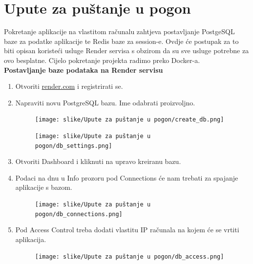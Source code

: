 			\eject 
		
		\section{Upute za puštanje u pogon}
		    Pokretanje aplikacije na vlastitom računalu zahtjeva postavljanje PostgeSQL baze za podatke aplikacije te Redis baze za session-e. Ovdje će postupak za to biti opisan koristeći usluge Render servisa s obzirom da su sve usluge potrebne za ovo besplatne. Cijelo pokretanje projekta radimo preko Docker-a.
		    \\
		
			\textbf{Postavljanje baze podataka na Render servisu}
			
			\begin{enumerate}
			    \item Otvoriti \href{https://render.com/}{render.com} i registrirati se.
			    \item Napraviti novu PostgreSQL bazu. Ime odabrati proizvoljno.
			    
			    \begin{figure}[H]
        			\texttt{[image: slike/Upute za puštanje u pogon/create\_db.png]}
        			\centering
        		\end{figure}
        		
        		\begin{figure}[H]
        			\texttt{[image: slike/Upute za puštanje u pogon/db\_settings.png]}
        			\centering
        		\end{figure}
        		
        		\item Otvoriti Dashboard i kliknuti na upravo kreiranu bazu.
        		\item Podaci na dnu u Info prozoru pod Connections će nam trebati za spajanje aplikacije s bazom.
        		
        		\begin{figure}[H]
        			\texttt{[image: slike/Upute za puštanje u pogon/db\_connections.png]}
        			\centering
        		\end{figure}
        		
        		\item Pod Access Control treba dodati vlastitu IP računala na kojem će se vrtiti aplikacija.
        		
        		\begin{figure}[H]
        			\texttt{[image: slike/Upute za puštanje u pogon/db\_access.png]}
        			\centering
        		\end{figure}
			
			\eject 
			\end{enumerate}
			
